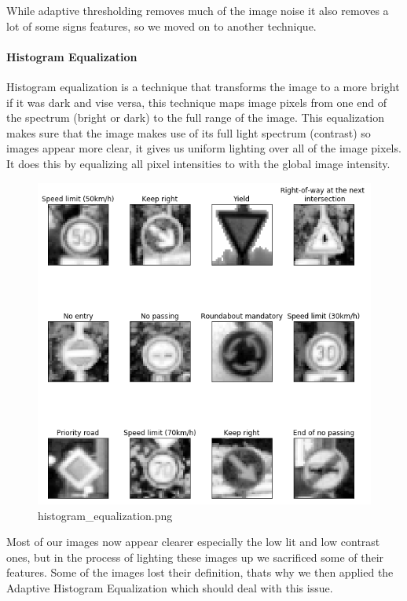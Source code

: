 \documentclass[11pt]{article}
\makeatletter
\def\maxwidth{\ifdim\Gin@nat@width>\linewidth\linewidth
    \else\Gin@nat@width\fi}
\let\Oldincludegraphics\includegraphics
\renewcommand{\includegraphics}[1]{\Oldincludegraphics[width=.8\maxwidth]{#1}}
\makeatother
\begin{document}
While adaptive thresholding removes much of the image noise it also
removes a lot of some signs features, so we moved on to another
technique.

\hypertarget{histogram-equalization}{%
\paragraph{Histogram Equalization}\label{histogram-equalization}}

Histogram equalization is a technique that transforms the image to a
more bright if it was dark and vise versa, this technique maps image
pixels from one end of the spectrum (bright or dark) to the full range
of the image. This equalization makes sure that the image makes use of
its full light spectrum (contrast) so images appear more clear, it gives
us uniform lighting over all of the image pixels. It does this by
equalizing all pixel intensities to with the global image intensity.

\begin{figure}
\centering
\includegraphics{./assets/histogram_equalization.png}
\caption{histogram\_equalization.png}
\end{figure}

Most of our images now appear clearer especially the low lit and low
contrast ones, but in the process of lighting these images up we
sacrificed some of their features. Some of the images lost their
definition, thats why we then applied the Adaptive Histogram
Equalization which should deal with this issue.
\end{document}
